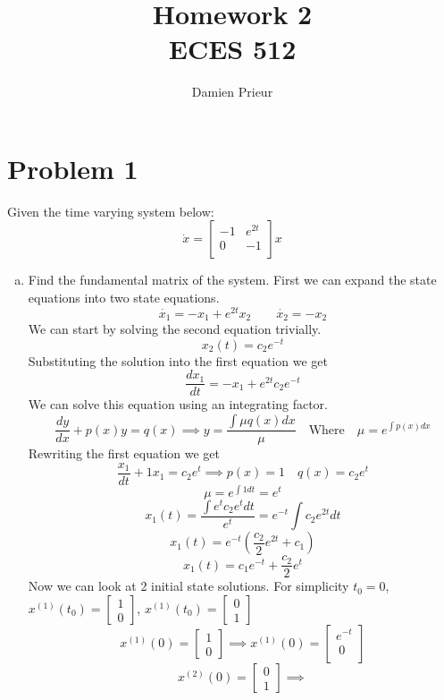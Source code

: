 \documentclass{article}
\author{Damien Prieur}
\title{Homework 2 \\ ECES 512}
\date{}
\begin{document}
\maketitle

\section*{Problem 1}
Given the time varying system below:
$$
\dot{x} =
\begin{bmatrix}
-1 & e^{2t} \\
0 & -1 \\
\end{bmatrix}
x
$$
\begin{enumerate}[a.]
\item Find the fundamental matrix of the system.
\newline
First we can expand the state equations into two state equations.
$$ \dot{x_1} = -x_1 + e^{2t}x_2 \qquad \dot{x_2} = -x_2 $$
We can start by solving the second equation trivially.
$$ x_2(t) = c_2e^{-t} $$
Substituting the solution into the first equation we get
$$ \frac{dx_1}{dt} = -x_1 + e^{2t} c_2e^{-t} $$
We can solve this equation using an integrating factor.
$$\frac{dy}{dx} + p(x)y = q(x) \implies y = \frac{\int \mu q(x) dx}{\mu} \quad \text{Where} \quad \mu = e^{\int p(x) dx}$$
Rewriting the first equation we get
$$ \frac{x_1}{dt} + 1 x_1 = c_2e^{t} \implies p(x) = 1 \quad q(x) = c_2e^{t} $$
$$ \mu = e^{\int 1 dt}  = e^t $$
$$ x_1(t) = \frac{\int e^t c_2e^{t}dt}{e^t} = e^{-t} \int c_2e^{2t} dt$$
$$ x_1(t) = e^{-t}(\frac{c_2}{2}e^{2t} + c_1) $$
$$ x_1(t) = c_1e^{-t}+\frac{c_2}{2}e^{t} $$
Now we can look at 2 initial state solutions. For simplicity $t_0 = 0$, $x^{(1)}(t_0) = \begin{bmatrix} 1 \\ 0 \end{bmatrix}$, $x^{(1)}(t_0) = \begin{bmatrix} 0 \\ 1 \end{bmatrix}$
$$x^{(1)}(0) = \begin{bmatrix} 1 \\ 0 \end{bmatrix} \implies
x^{(1)}(0) =
\begin{bmatrix}
e^{-t}\\\
0\\
\end{bmatrix}
$$
$$x^{(2)}(0) = \begin{bmatrix} 0 \\ 1 \end{bmatrix} \implies
$$
\end{enumerate}
\end{document}
